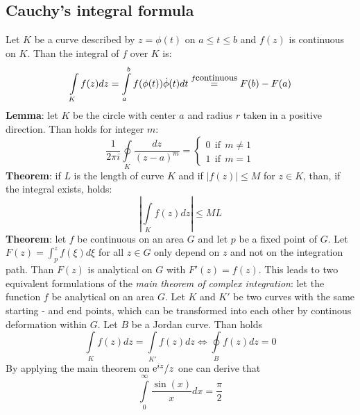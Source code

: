\documentclass[twoside]{report}
\begin{document}
\subsection{Cauchy's integral formula}
Let $K$ be a curve described by $z=\phi(t)$ on $a\leq t\leq b$ and $f(z)$
is continuous on $K$. Than the integral of $f$ over $K$ is:
\[
\int\limits_Kf(z)dz=\int\limits_a^bf(\phi(t))\dot{\phi}(t)dt
\stackrel{f\mbox{\small continuous}}{=}F(b)-F(a)
\]
{\bf Lemma}: let $K$ be the circle with center $a$ and radius $r$ taken in a
positive direction. Than holds for integer $m$:
\[
\frac{1}{2\pi i}\oint\limits_K \frac{dz}{(z-a)^m}=\left\{
\begin{array}{l}
0~~\mbox{if}~~m\neq1\\
1~~\mbox{if}~~m=1
\end{array}\right.
\]
{\bf Theorem}: if $L$ is the length of curve $K$ and if $|f(z)|\leq M$ for
$z\in K$, than, if the integral exists, holds:
\[
\left|\int\limits_K f(z)dz\right|\leq ML
\]
{\bf Theorem}: let $f$ be continuous on an area $G$ and let $p$ be a fixed
point of $G$. Let $F(z)=\int_p^zf(\xi)d\xi$ for all $z\in G$ only depend on
$z$ and not on the integration path. Than $F(z)$ is analytical on $G$ with
$F'(z)=f(z)$.
\npar
This leads to two equivalent formulations of the {\it main theorem of
complex integration}: let the function $f$ be analytical on an area $G$. Let
$K$ and $K'$ be two curves with the same starting - and end points, which can be
transformed into each other by continous deformation within $G$. Let $B$ be
a Jordan curve. Than holds
\[
\int\limits_Kf(z)dz=\int\limits_{K'}f(z)dz\Leftrightarrow\oint\limits_Bf(z)dz=0
\]
By applying the main theorem on ${\rm e}^{iz}/z$ one can derive that
\[
\int\limits_0^\infty\frac{\sin(x)}{x}dx=\frac{\pi}{2}
\]
\end{document}
